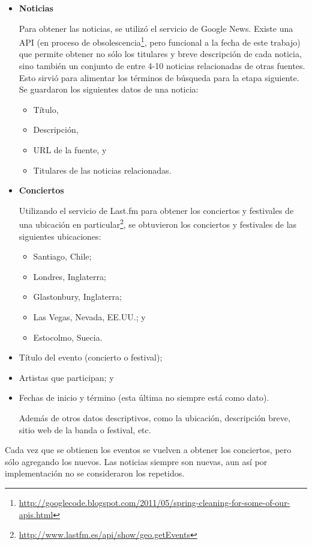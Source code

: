 \begin{itemize}
\item \textbf{Noticias}

  Para obtener las noticias, se utilizó el servicio de Google
  News. Existe una API (en proceso de
  obsolescencia\footnote{\href{http://googlecode.blogspot.com/2011/05/spring-cleaning-for-some-of-our-apis.html}{http://googlecode.blogspot.com/2011/05/spring-cleaning-for-some-of-our-apis.html} },
  pero funcional a la fecha de este trabajo) que permite
  obtener no sólo los titulares y breve descripción de cada noticia,
  sino también un conjunto de entre 4-10 noticias relacionadas de otras
  fuentes. Esto sirvió para alimentar los términos de búsqueda para la
  etapa siguiente. Se guardaron los siguientes datos de una noticia:

\begin{itemize}
\item Título,
\item Descripción,
\item URL de la fuente, y
\item Titulares de las noticias relacionadas.
\end{itemize}

\item \textbf{Conciertos}

  Utilizando el servicio de Last.fm para obtener los conciertos y
  festivales de una ubicación en
  particular\footnote{\href{http://www.lastfm.es/api/show/geo.getEvents}{http://www.lastfm.es/api/show/geo.getEvents} }, se
  obtuvieron los conciertos y festivales de las siguientes
  ubicaciones:

\begin{itemize}
\item Santiago, Chile;
\item Londres, Inglaterra;
\item Glastonbury, Inglaterra;
\item Las Vegas, Nevada, EE.UU.; y
\item Estocolmo, Suecia.
\end{itemize}

\item Título del evento (concierto o festival);
\item Artistas que participan; y
\item Fechas de inicio y término (esta última no siempre está como
    dato).


  Además de otros datos descriptivos, como la ubicación, descripción
  breve, sitio web de la banda o festival, etc.
\end{itemize}
Cada vez que se obtienen los eventos se vuelven a obtener los
conciertos, pero sólo agregando los nuevos. Las noticias siempre son
nuevas, aun así por implementación no se consideraron los repetidos.

